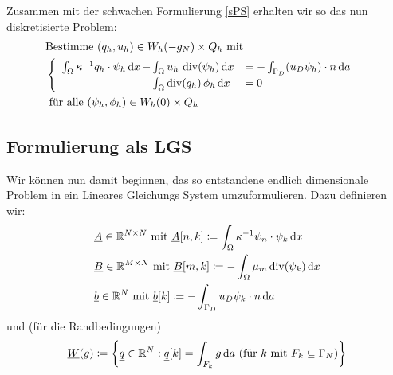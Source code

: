 Zusammen mit der schwachen Formulierung \eqref{sPS} erhalten wir so das nun diskretisierte Problem:
\begin{align*}
&\text{Bestimme } (q_h,u_h) \in W_h(-g_N) \times Q_h \text{ mit}\\
&\begin{cases}
\begin{array}{llll}
\int_{\Omega} \kappa^{-1} q_h \cdot \psi_h \, \mathrm{d} x \, - \mkern-15mu &\int_{\Omega} u_h \, \operatorname{div}(\psi_h) \, \mathrm{d} x &= - \int_{\Gamma_D} (u_D \psi_h) \cdot n \, \mathrm{d} a\\
&\int_{\Omega} \operatorname{div}(q_h) \, \phi_h \, \mathrm{d} x &= 0
\end{array}
\end{cases}	\\
&\text{ für alle } (\psi_h, \phi_h) \in W_h(0) \times Q_h
\end{align*} 




\subsection{Formulierung als LGS}

Wir können nun damit beginnen, das so entstandene endlich dimensionale Problem in ein Lineares Gleichungs System umzuformulieren. Dazu definieren wir:
	\begin{align*}
	&\underline{A} \in \mathbb{R}^{N \times N} \text{ mit } \underline{A}[n,k] \coloneqq \int_{\Omega} \kappa^{-1} \psi_n \cdot \psi_k \, \mathrm{d} x \\
	&\underline{B} \in \mathbb{R}^{M \times N} \text{ mit } \underline{B}[m,k] \coloneqq - \int_{\Omega} \mu_m \operatorname{div}(\psi_k) \, \mathrm{d} x \\
	&\underline{b} \in \mathbb{R}^N \text{ mit } \underline{b}[k] \coloneqq - \int_{\Gamma_D} u_D \psi_k \cdot n \, \mathrm{d} a
	\end{align*}
	und (für die Randbedingungen)
	\begin{align*}
	\underline{W}(g) \coloneqq \left\{ \underline{q} \in \mathbb{R}^N : \underline{q}[k] = \int_{F_k} g  \, \mathrm{d} a \ (\text{für } k \text{ mit } F_k \subseteq \Gamma_N) \right\} 
	\end{align*}


